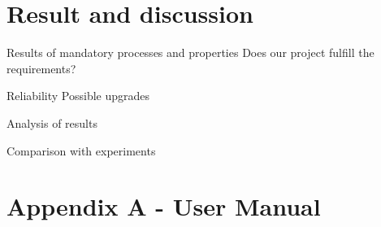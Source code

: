 \documentclass[12pt,a4paper]{article}
\begin{document}
\newpage
\section{Result and discussion}
\label{sec:Result}

Results of mandatory processes and properties
Does our project fulfill the requirements?

Reliability
Possible upgrades

Analysis of results

Comparison with experiments

\newpage
\section*{Appendix A - User Manual}
\label{sec:AppendixA}
\end{document}
